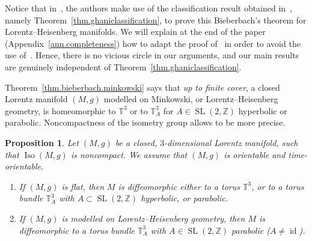 \documentclass[11pt]{article}
\newtheorem{prop}[theo]{Proposition}
\theoremstyle{definition}
\numberwithin{equation}{section}
\numberwithin{figure}{section}
\numberwithin{table}{section}
\DeclareMathOperator{\Iso}{Iso}
\DeclareMathOperator{\SL}{SL}
\DeclareMathOperator{\id}{id}
\newcommand*\TT{\mathbb{T}}
\newcommand*\ZZ{\mathbb{Z}}
\begin{document}
Notice that in~\cite{sorin.ghani}, the authors make use of the classification result obtained in~\cite{zeghibflot}, namely Theorem~\ref{thm.ghaniclassification}, to prove this Bieberbach's theorem for Lorentz--Heisenberg manifolds. We will explain at the end of the paper (Appendix~\ref{ann.completeness}) how to adapt the proof of~\cite[Proposition~8.1]{sorin.ghani} in order to avoid the use of~\cite{zeghibflot}. Hence, there is no vicious circle in our arguments, and our main results are genuinely independent of Theorem~\ref{thm.ghaniclassification}.



Theorem~\ref{thm.bieberbach.minkowski} says that \emph{up to finite cover}, a closed Lorentz manifold $(M,g)$ modelled on Minkowski, or Lorentz--Heisenberg geometry, is homeomorphic to $\TT^3$ or to $\TT_A^3$ for $A \in \SL(2,\ZZ)$ hyperbolic or parabolic. Noncompactness of the isometry group allows to be more precise.


\begin{prop}\label{prop.topologie.minkowski}
Let $(M,g)$ be a closed, $3$-dimensional Lorentz manifold, such that $\Iso(M,g)$ is noncompact. We assume that $(M,g)$ is orientable and time-orientable.
\begin{enumerate}
\item \label{list4.6.1}If $(M,g)$ is flat, then $M$ is diffeomorphic either to a torus $\TT^3$, or to a torus bundle $\TT_A^3$ with $A \subset \SL(2,\ZZ)$ hyperbolic, or parabolic.
\item \label{list4.6.2}If $(M,g)$ is modelled on Lorentz--Heisenberg geometry, then $M$ is diffeomorphic to a torus bundle $\TT_A^3$ with $A \in \SL(2,\ZZ)$ parabolic ($A \not =\id$).
\end{enumerate}
\end{prop}
\end{document}
